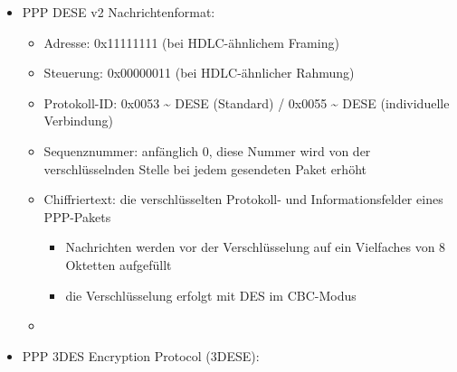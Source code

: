 \documentclass[a4paper]{article}
\begin{document}
\begin{multicols}{3}
\begin{itemize}
\begin{itemize}
                        \begin{itemize}
                            \item
                                  Code: 1 \textasciitilde{} configure request
                            \item
                                  Identifier: ändert sich mit jeder neuen Anfrage
                            \item
                                  Länge: Gesamtlänge der Configure-Request-Nachricht
                            \item
                                  Type: 3 \textasciitilde{} DESEv2
                            \item
                                  Länge': 10 (die Länge dieser Konfigurationsoption)
                            \item
                                  Initial Nonce: ein Initialisierungsvektor für DES im CBC-Modus (8
                                  Oktette)
                        \end{itemize}
              \end{itemize}
        \item
              PPP DESE v2 Nachrichtenformat:

              \begin{itemize}
                  \item
                        Adresse: 0x11111111 (bei HDLC-ähnlichem Framing)
                  \item
                        Steuerung: 0x00000011 (bei HDLC-ähnlicher Rahmung)
                  \item
                        Protokoll-ID: 0x0053 \textasciitilde{} DESE (Standard) / 0x0055
                        \textasciitilde{} DESE (individuelle Verbindung)
                  \item
                        Sequenznummer: anfänglich 0, diese Nummer wird von der
                        verschlüsselnden Stelle bei jedem gesendeten Paket erhöht
                  \item
                        Chiffriertext: die verschlüsselten Protokoll- und Informationsfelder
                        eines PPP-Pakets

                        \begin{itemize}
                            \item
                                  Nachrichten werden vor der Verschlüsselung auf ein Vielfaches von
                                  8 Oktetten aufgefüllt
                            \item
                                  die Verschlüsselung erfolgt mit DES im CBC-Modus
                        \end{itemize}
                  \item
              \end{itemize}
        \item
              PPP 3DES Encryption Protocol (3DESE):


\end{itemize}
\end{multicols}
\end{document}

